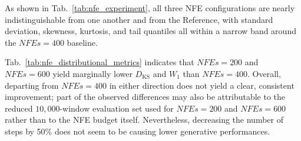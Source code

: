 As shown in Tab.\ \ref{tab:nfe_experiment}, all three NFE configurations are nearly indistinguishable from one another and from the Reference, with standard deviation, skewness, kurtosis, and tail quantiles all within a narrow band around the \(NFEs=400\) baseline.

Tab.\ \ref{tab:nfe_distributional_metrics} indicates that \(NFEs=200\) and \(NFEs=600\) yield marginally lower \(D_{\mathrm{KS}}\) and \(W_1\) than \(NFEs=400\). Overall, departing from \(NFEs=400\) in either direction does not yield a clear, consistent improvement; part of the observed differences may also be attributable to the reduced \(10,000\)-window evaluation set used for \(NFEs=200\) and \(NFEs=600\) rather than to the NFE budget itself. Nevertheless, decreasing the number of steps by 50\% does not seem to be causing lower generative performances.

%

